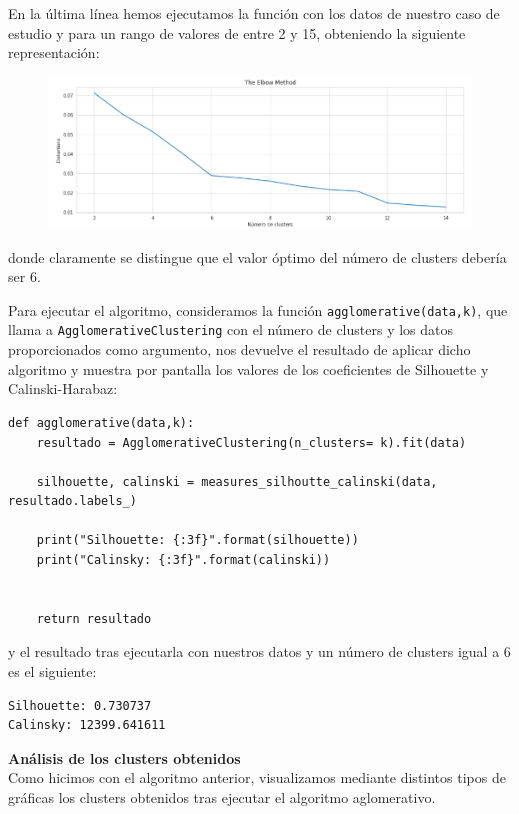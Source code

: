 \documentclass[a4paper,11pt]{book}
\begin{document}
En la última línea hemos ejecutamos la función con los datos de nuestro caso de estudio y para un rango de valores de entre 2 y 15, obteniendo la siguiente representación: 

\begin{figure}[H]
	\centering
	\includegraphics[width=0.9\linewidth]{img/elbow3}
	\caption{}
	\label{fig:elbow3}
\end{figure}


donde claramente se distingue que el valor óptimo del número de clusters debería ser 6. 

Para ejecutar el algoritmo, consideramos la función \texttt{agglomerative(data,k)}, que llama a \texttt{AgglomerativeClustering} con el número de clusters y los datos proporcionados como argumento, nos devuelve el resultado de aplicar dicho algoritmo y muestra por pantalla los valores de los coeficientes de Silhouette y Calinski-Harabaz:

\begin{verbatim}
def agglomerative(data,k):
	resultado = AgglomerativeClustering(n_clusters= k).fit(data)
	
	silhouette, calinski = measures_silhoutte_calinski(data, resultado.labels_)
	
	print("Silhouette: {:3f}".format(silhouette))
	print("Calinsky: {:3f}".format(calinski))
	
	
	return resultado
\end{verbatim}

y el resultado tras ejecutarla con nuestros datos y un número de clusters igual a 6 es el siguiente:
\begin{verbatim}
Silhouette: 0.730737
Calinsky: 12399.641611
\end{verbatim}

\textbf{Análisis de los clusters obtenidos}\\[0.05cm]

Como hicimos con el algoritmo anterior, visualizamos mediante distintos tipos de gráficas los clusters obtenidos tras ejecutar el algoritmo aglomerativo. 
\end{document}
